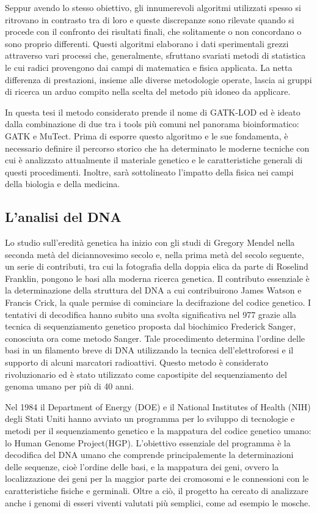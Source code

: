 Seppur avendo lo stesso obiettivo, gli innumerevoli algoritmi utilizzati spesso si ritrovano in contrasto tra di loro e queste discrepanze sono rilevate quando si procede con il confronto dei risultati finali, che solitamente o non concordano o sono proprio differenti.
Questi algoritmi elaborano i dati sperimentali grezzi attraverso vari processi che, generalmente, sfruttano svariati metodi di statistica le cui radici provengono dai campi di matematica e fisica applicata.
La netta differenza di prestazioni, insieme alle diverse metodologie operate, lascia ai gruppi di ricerca un arduo compito nella scelta del metodo più idoneo da applicare.

In questa tesi il metodo considerato prende il nome di GATK-LOD ed è ideato dalla combinazione di due tra i tools più comuni nel panorama bioinformatico: GATK e MuTect.
Prima di esporre questo algoritmo e le sue fondamenta, è necessario definire il percorso storico che ha determinato le moderne tecniche con cui è analizzato attualmente il materiale genetico e le caratteristiche generali di questi procedimenti.
Inoltre, sarà sottolineato l'impatto della fisica nei campi della biologia e della medicina.

\subsection{L'analisi del DNA}
Lo studio sull'eredità genetica ha inizio con gli studi di Gregory Mendel nella seconda metà del diciannovesimo secolo e, nella prima metà del secolo seguente, un serie di contributi, tra cui la fotografia della doppia elica da parte di Roselind Franklin, pongono le basi alla moderna ricerca genetica.
Il contributo essenziale è la determinazione della struttura del DNA a cui contribuirono James Watson e Francis Crick, la quale permise di cominciare la decifrazione del codice genetico.
I tentativi di decodifica hanno subito una svolta significativa nel 
977 grazie alla tecnica di sequenziamento genetico proposta dal biochimico Frederick Sanger, conosciuta ora come metodo Sanger.
Tale procedimento determina l'ordine delle basi in un filamento breve di DNA utilizzando la tecnica dell'elettroforesi e il supporto di alcuni marcatori radioattivi.
Questo metodo è considerato rivoluzionario ed è stato utilizzato come capostipite del sequenziamento del genoma umano per più di 40 anni.

Nel 1984 il Department of Energy (DOE) e il National Institutes of Health (NIH) degli Stati Uniti hanno avviato un programma per lo sviluppo di tecnologie e metodi per il sequenziamento genetico e la mappatura del codice genetico umano: lo Human Genome Project(HGP).
L'obiettivo essenziale del programma è la decodifica del DNA umano che comprende principalemente la determinazioni delle sequenze, cioè l'ordine delle basi, e la mappatura dei geni, ovvero la localizzazione dei geni per la maggior parte dei cromosomi e le connessioni con le caratteristiche fisiche e germinali.
Oltre a ciò, il progetto ha cercato di analizzare anche i genomi di esseri viventi valutati più semplici, come ad esempio le mosche.

